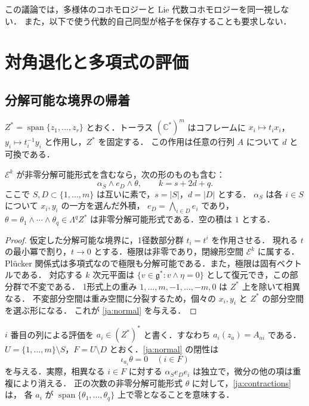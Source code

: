 \documentclass[12pt]{amsart}
\theoremstyle{definition}
\theoremstyle{remark}
\numberwithin{equation}{section}
\newcommand{\C}{\mathbb{C}}
\newcommand{\gfr}{\mathfrak g}
\newcommand{\Eex}{\mathcal E}
\newcommand{\Span}{\operatorname{span}}
\begin{document}
この議論では，多様体のコホモロジーと Lie 代数コホモロジーを同一視しない．
また，以下で使う代数的自己同型が格子を保存することも要求しない．

\section{対角退化と多項式の評価}
\subsection{分解可能な境界の帰着}
$Z^*=\Span\{z_1,\ldots,z_r\}$ とおく．トーラス $(\C^*)^m$ はコフレームに
$x_i\mapsto t_i x_i$，$y_i\mapsto t_i^{-1}y_i$ と作用し，$Z^*$ を固定する．
この作用は任意の行列 $A$ について $d$ と可換である．

\begin{jlem}\label{ja:fixed}
$\Eex^k$ が非零分解可能形式を含むなら，次の形のものも含む：
\begin{equation}\label{ja:normal}
 \alpha_S\wedge e_D\wedge\theta,
 \qquad k=s+2d+q.
\end{equation}
ここで $S,D\subset\{1,\ldots,m\}$ は互いに素で，$s=|S|$，$d=|D|$ とする．
$\alpha_S$ は各 $i\in S$ について $x_i,y_i$ の一方を選んだ外積，
$e_D=\bigwedge_{i\in D}e_i$ であり，
$\theta=\theta_1\wedge\cdots\wedge\theta_q\in\Lambda^q Z^*$ は非零分解可能形式である．空の積は $1$ とする．
\end{jlem}
\begin{proof}
仮定した分解可能な境界に，1径数部分群 $t_i=t^i$ を作用させる．
現れる $t$ の最小冪で割り，$t\to0$ とする．極限は非零であり，閉線形空間 $\Eex^k$ に属する．
Pl\"ucker 関係式は多項式なので極限も分解可能である．また，極限は固有ベクトルである．
対応する $k$ 次元平面は $\{v\in\gfr^*:v\wedge\eta=0\}$ として復元でき，この部分群で不変である．
1形式上の重み $1,\ldots,m,-1,\ldots,-m,0$ は $Z^*$ 上を除いて相異なる．
不変部分空間は重み空間に分裂するため，個々の $x_i,y_i$ と $Z^*$ の部分空間を選ぶ形になる．
これが \eqref{ja:normal} を与える．
\end{proof}

$i$ 番目の列による評価を $a_i\in(Z^*)^*$ と書く．すなわち $a_i(z_a)=A_{ai}$ である．
$U=\{1,\ldots,m\}\setminus S$，$F=U\setminus D$ とおく．\eqref{ja:normal} の閉性は
\begin{equation}\label{ja:contractions}
 \iota_{a_i}\theta=0\quad(i\in F)
\end{equation}
を与える．実際，相異なる $i\in F$ に対する $\alpha_S e_D e_i$ は独立で，微分の他の項は重複により消える．
正の次数の非零分解可能形式 $\theta$ に対して，\eqref{ja:contractions} は，
各 $a_i$ が $\Span\{\theta_1,\ldots,\theta_q\}$ 上で零となることを意味する．
\end{document}
